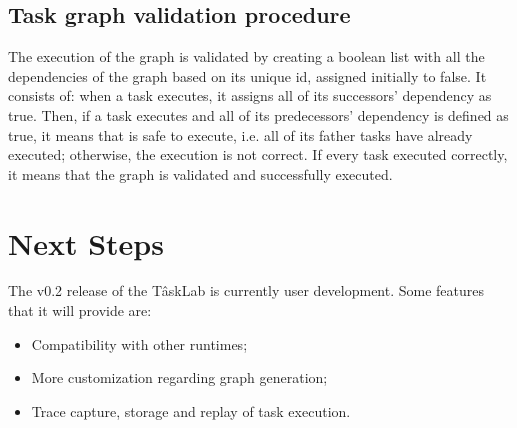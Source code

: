 \subsection{Task graph validation procedure}
The execution of the graph is validated by creating a boolean list with all the dependencies of the graph based on its unique id, assigned initially to false. It consists of: when a task executes, it assigns all of its successors' dependency as true. Then, if a task executes and all of its predecessors' dependency is defined as true, it means that is safe to execute, i.e. all of its father tasks have already executed; otherwise, the execution is not correct. If every task executed correctly, it means that the graph is validated and successfully executed.

\section{Next Steps}
The v0.2 release of the TâskLab  is currently user development. Some features that it will provide are:
 \begin{itemize}
\item Compatibility with other runtimes;
\item More customization regarding graph generation;
\item Trace capture, storage and replay of task  execution. 
\end{itemize}

